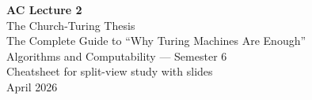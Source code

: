 \documentclass[11pt,a4paper]{article}
\begin{document}
\begin{center}
{\Huge\bfseries AC Lecture 2}\\[0.5em]
{\LARGE The Church-Turing Thesis}\\[0.3em]
{\large The Complete Guide to ``Why Turing Machines Are Enough''}\\[1em]
{\normalsize Algorithms and Computability --- Semester 6}\\
{\normalsize Cheatsheet for split-view study with slides}\\[0.5em]
{\normalsize April 2026}
\end{center}

\vspace{1em}
\tableofcontents
\newpage


\newpage

\newpage

\newpage

\newpage

\newpage

\newpage

\end{document}
